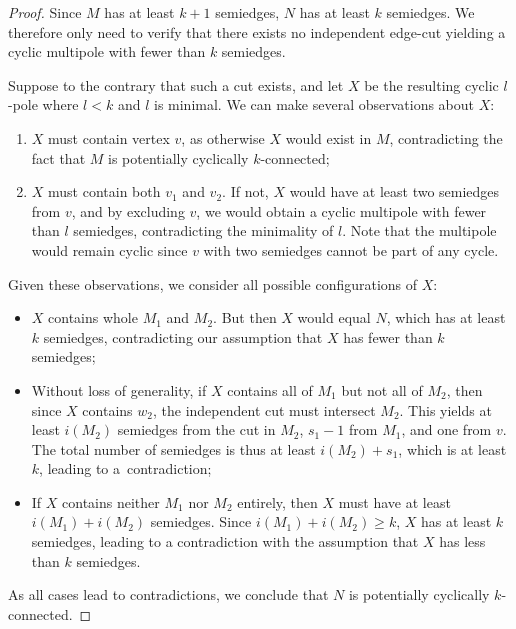 \documentclass[12pt, twoside]{book}
\begin{document}
\begin{proof}
	Since $M$ has at least $k+1$ semiedges, $N$ has at least $k$ semiedges. We therefore only need to verify that there exists no independent edge-cut yielding a cyclic multipole with fewer than $k$ semiedges.
	
	Suppose to the contrary that such a cut exists, and let $X$ be the resulting cyclic $l$-pole where $l<k$ and $l$ is minimal. We can make several observations about $X$:
	\begin{enumerate}[label=(\roman*)]
		\item $X$ must contain vertex $v$, as otherwise $X$ would exist in $M$, contradicting the fact that $M$ is potentially cyclically $k$-connected;
		\item $X$ must contain both $v_1$ and $v_2$. If not, $X$ would have at least two semiedges from $v$, and by excluding $v$, we would obtain a cyclic multipole with fewer than $l$ semiedges, contradicting the minimality of $l$. Note that the multipole would remain cyclic since $v$ with two semiedges cannot be part of any cycle.
	\end{enumerate}
	
	Given these observations, we consider all possible configurations of $X$:
	\begin{itemize}
		\item $X$ contains whole $M_1$ and $M_2$. But then $X$ would equal $N$, which has at least $k$ semiedges, contradicting our assumption that $X$ has fewer than $k$ semiedges;
		\item Without loss of generality, if $X$ contains all of $M_1$ but not all of $M_2$, then since $X$ contains $w_2$, the independent cut must intersect $M_2$. This yields at least $i(M_2)$ semiedges from the cut in $M_2$, $s_1-1$ from $M_1$, and one from $v$. The total number of semiedges is thus at least $i(M_2)+s_1$, which is at least $k$, leading to a~contradiction;
		\item If $X$ contains neither $M_1$ nor $M_2$ entirely, then $X$ must have at least $i(M_1)+i(M_2)$ semiedges. Since $i(M_1)+i(M_2)\geq k$, $X$ has at least $k$ semiedges, leading to a contradiction with the assumption that $X$ has less than $k$ semiedges.
	\end{itemize}

	As all cases lead to contradictions, we conclude that $N$ is potentially cyclically $k$-connected.
\end{proof}
\end{document}
